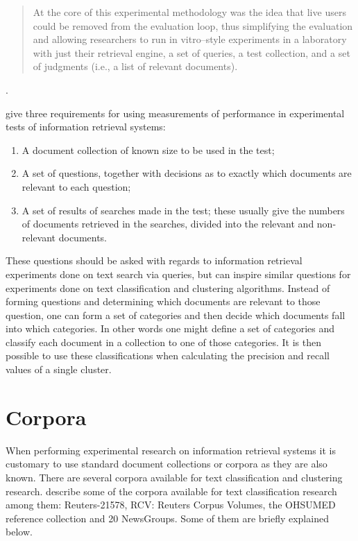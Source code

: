 \begin{quote}
At the core of this experimental methodology was the idea that live users could be removed from the evaluation loop, thus simplifying the evaluation and allowing researchers to run in vitro–style experiments in a laboratory with just their retrieval engine, a set of queries, a test collection, and a set of judgments (i.e., a list of relevant documents).
\end{quote}.

\cite[p. 33]{Cleverdon1966} give three requirements for using measurements of performance in experimental tests of information retrieval systems:
\begin{enumerate}
\item A document collection of known size to be used in the test;
\item A set of questions, together with decisions as to exactly which documents are relevant to each question;
\item A set of results of searches made in the test; these usually give the numbers of documents retrieved in the searches, divided into the relevant and non-relevant documents.
\end{enumerate}
These questions should be asked with regards to information retrieval experiments done on text search via queries, but can inspire similar questions for experiments done on text classification and clustering algorithms. Instead of forming questions and determining which documents are relevant to those question, one can form a set of categories and then decide which documents fall into which categories. In other words one might define a set of categories and classify each document in a collection to one of those categories. It is then possible to use these classifications when calculating the precision and recall values of a single cluster.

\section{Corpora}
\label{Corpora}

When performing experimental research on information retrieval systems it is customary to use standard document collections or corpora as they are also known. There are several corpora available for text classification and clustering research. \cite{Baeza-Yates2011a} describe some of the corpora available for text classification research among them: Reuters-21578, RCV: Reuters Corpus Volumes, the OHSUMED reference collection and 20 NewsGroups. Some of them are briefly explained below.

